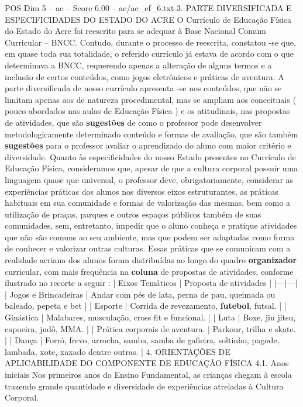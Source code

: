 \begin{textsample}{POS Dim 5 – ac – Score 6.00 – ac/ac\_ef\_6.txt}  \label{ex:f5_pos_128}
3.
PARTE DIVERSIFICADA E ESPECIFICIDADES DO ESTADO DO ACRE O Currículo de Educação Física do Estado do Acre foi reescrito para se adequar à Base Nacional Comum Curricular – BNCC.
Contudo, durante o processo de reescrita, constatou -se que, em quase toda sua totalidade, o referido currículo já estava de acordo com o que determinava a BNCC, requerendo apenas a alteração de alguns termos e a inclusão de certos conteúdos, como jogos eletrônicos e práticas de aventura.
A parte diversificada de nosso currículo apresenta -se nos conteúdos, que não se limitam apenas aos de natureza procedimental, mas se ampliam aos conceituais ( pouco abordados nas aulas de Educação Física ) e os atitudinais, nas propostas de atividades, que são \textbf{sugestões} de como o professor pode desenvolver metodologicamente determinado conteúdo e formas de avaliação, que são também \textbf{sugestões} para o professor avaliar o aprendizado do aluno com maior critério e diversidade.
Quanto às especificidades do nosso Estado presentes no Currículo de Educação Física, consideramos que, apesar de que a cultura corporal possuir uma linguagem quase que universal, o professor deve, obrigatoriamente, considerar as experiências práticas dos alunos nos diversos eixos estruturantes, as práticas habituais em sua comunidade e formas de valorização das mesmas, bem como a utilização de praças, parques e outros espaços públicos também de suas comunidades, sem, entretanto, impedir que o aluno conheça e pratique atividades que não são comuns ao seu ambiente, mas que podem ser adaptadas como forma de conhecer e valorizar outras culturas.
Essas práticas que se comunicam com a realidade acriana dos alunos foram distribuídas ao longo do quadro \textbf{organizador} curricular, com mais frequência na \textbf{coluna} de propostas de atividades, conforme ilustrado no recorte a seguir : | Eixos Temáticos | Proposta de atividades | |---|---| | Jogos e Brincadeiras | Andar com pés de lata, perna de pau, queimada ou baleado, pepeta e bet | | Esporte | Corrida de revezamento, \textbf{futebol}, futsal. | | Ginástica | Malabares, musculação, cross fit e funcional. | | Luta | Boxe, jiu jitsu, capoeira, judô, MMA. | | Prática corporais de aventura. | Parkour, trilha e skate. | | Dança | Forró, frevo, arrocha, samba, samba de gafieira, soltinho, pagode, lambada, xote, xaxado dentre outras. | 4.
ORIENTAÇÕES DE APLICABILIDADE DO COMPONENTE DE EDUCAÇÃO FÍSICA 4.1.
Anos iniciais Nos primeiros anos do Ensino Fundamental, as crianças chegam à escola trazendo grande quantidade e diversidade de experiências atreladas à Cultura Corporal.

\end{textsample}
